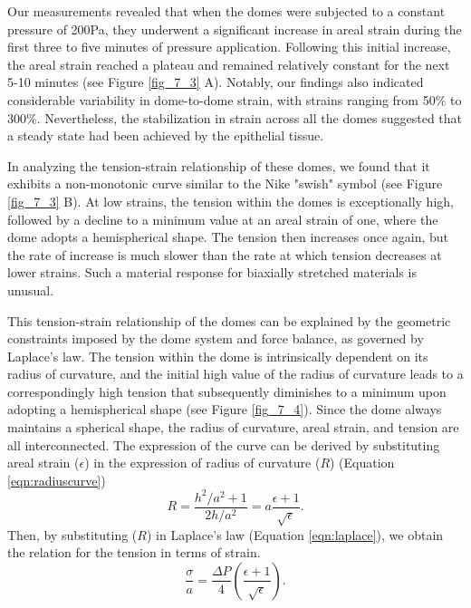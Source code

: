 Our measurements revealed that when the domes were subjected to a constant pressure of 200\unit{\pascal}, they underwent a significant increase in areal strain during the first three to five minutes of pressure application. Following this initial increase, the areal strain reached a plateau and remained relatively constant for the next 5-10 minutes (see Figure \ref{fig_7_3} A). Notably, our findings also indicated considerable variability in dome-to-dome strain, with strains ranging from 50\% to 300\%. Nevertheless, the stabilization in strain across all the domes suggested that a steady state had been achieved by the epithelial tissue.

In analyzing the tension-strain relationship of these domes, we found that it exhibits a non-monotonic curve similar to the Nike "swish" symbol (see Figure \ref{fig_7_3} B). At low strains, the tension within the domes is exceptionally high, followed by a decline to a minimum value at an areal strain of one, where the dome adopts a hemispherical shape. The tension then increases once again, but the rate of increase is much slower than the rate at which tension decreases at lower strains. Such a material response for biaxially stretched materials is unusual.

This tension-strain relationship of the domes can be explained by the geometric constraints imposed by the dome system and force balance, as governed by Laplace's law. The tension within the dome is intrinsically dependent on its radius of curvature, and the initial high value of the radius of curvature leads to a correspondingly high tension that subsequently diminishes to a minimum upon adopting a hemispherical shape (see Figure \ref{fig_7_4}). Since the dome always maintains a spherical shape, the radius of curvature, areal strain, and tension are all interconnected. The expression of the curve can be derived by substituting areal strain ($\epsilon$) in the expression of radius of curvature ($R$) (Equation \ref{eqn:radiuscurve})
\begin{equation}
	R = \frac{h^2/a^2 + 1}{2h/a^2} = a\frac{\epsilon + 1}{\sqrt{\epsilon}}.
\end{equation}
Then, by substituting ($R$) in Laplace's law (Equation \ref{eqn:laplace}), we obtain the relation for the tension in terms of strain.
\begin{equation}
	\label{eqn:isobaric}
	\frac{\sigma}{a} = \frac{\Delta P}{4} \left( \frac{\epsilon + 1}{\sqrt{\epsilon}} \right).
\end{equation}

